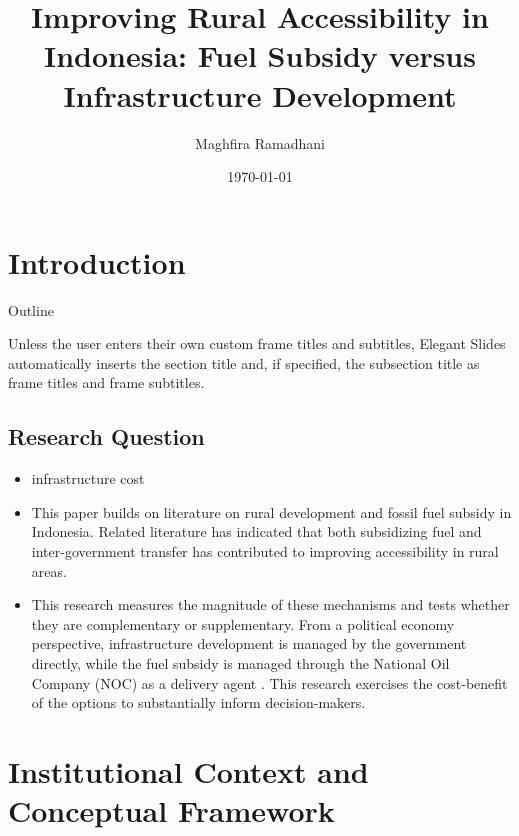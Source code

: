 \documentclass[
11pt,notheorems,compress,hyperref={pdfauthor=Maghfira Ramadhani}
]{beamer}
\title[
]{Improving Rural Accessibility in Indonesia: Fuel Subsidy versus Infrastructure Development}
\author[
]{
    Maghfira Ramadhani 
}
\institute{
    School of Economics, \\
    Georgia Institute of Technology}
\date{\today}
\begin{document}
{
\begin{frame}
  \titlepage
\end{frame}
}
\addtocounter{framenumber}{-1}

\section{Introduction}
{
\begin{frame}{Outline}
    \tableofcontents%
\end{frame}
}

\begin{frame}
    Unless the user enters their own custom frame titles and subtitles, Elegant Slides automatically inserts the section title and, if specified, the subsection title as frame titles and frame subtitles.
\end{frame}

\subsection{Research Question}
\begin{frame}
\begin{itemize}
    \item infrastructure \up \so cost \up \citet{hartojo_2022}
    \item This paper builds on literature on rural development and fossil fuel subsidy in Indonesia. Related literature has indicated that both subsidizing fuel and inter-government transfer has contributed to improving accessibility in rural areas. 
    \item This research measures the magnitude of these mechanisms and tests whether they are complementary or supplementary. From a political economy perspective, infrastructure development is managed by the government directly, while the fuel subsidy is managed through the National Oil Company (NOC) as a delivery agent \citet{ichsan_2022}. This research exercises the cost-benefit of the options to substantially inform decision-makers.
\end{itemize}
\end{frame}

\section{Institutional Context and Conceptual Framework}
\end{document}
